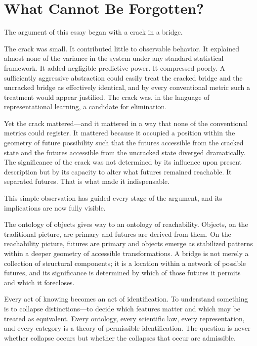 \documentclass[12pt,a4paper]{article}
\theoremstyle{plain}
\theoremstyle{definition}
\theoremstyle{remark}
\begin{document}
\section{What Cannot Be Forgotten?}

The argument of this essay began with a crack in a bridge.

The crack was small. It contributed little to observable behavior. It
explained almost none of the variance in the system under any standard
statistical framework. It added negligible predictive power. It compressed
poorly. A sufficiently aggressive abstraction could easily treat the cracked
bridge and the uncracked bridge as effectively identical, and by every
conventional metric such a treatment would appear justified. The crack was,
in the language of representational learning, a candidate for elimination.

Yet the crack mattered---and it mattered in a way that none of the
conventional metrics could register. It mattered because it occupied a
position within the geometry of future possibility such that the
futures accessible from the cracked state and the futures accessible from
the uncracked state diverged dramatically. The significance of the crack was
not determined by its influence upon present description but by its capacity
to alter what futures remained reachable. It separated futures. That is what
made it indispensable.

This simple observation has guided every stage of the argument, and its
implications are now fully visible.

The ontology of objects gives way to an ontology of reachability. Objects,
on the traditional picture, are primary and futures are derived from them.
On the reachability picture, futures are primary and objects emerge as
stabilized patterns within a deeper geometry of accessible transformations.
A bridge is not merely a collection of structural components; it is a
location within a network of possible futures, and its significance is
determined by which of those futures it permits and which it forecloses.

Every act of knowing becomes an act of identification. To understand
something is to collapse distinctions---to decide which features matter and
which may be treated as equivalent. Every ontology, every scientific law,
every representation, and every category is a theory of permissible
identification. The question is never whether collapse occurs but whether
the collapses that occur are admissible.
\end{document}

